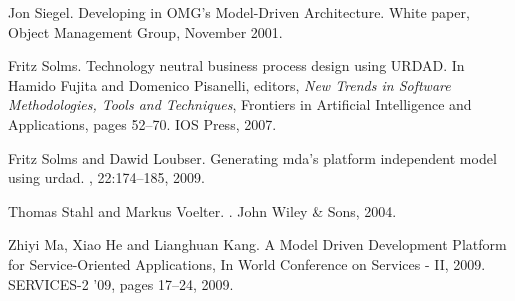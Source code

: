 \begin{thebibliography}{}
Jon Siegel.
\newblock Developing in {OMG}'s {M}odel-{D}riven {A}rchitecture.
\newblock White paper, Object Management Group, November 2001.

Fritz Solms.
\newblock Technology neutral business process design using {URDAD}.
\newblock In Hamido Fujita and Domenico Pisanelli, editors, {\em New Trends in
  Software Methodologies, Tools and Techniques}, Frontiers in Artificial
  Intelligence and Applications, pages 52--70. IOS Press, 2007.

Fritz Solms and Dawid Loubser.
\newblock Generating mda's platform independent model using urdad.
, 22:174--185, 2009.

Thomas Stahl and Markus Voelter.
.
\newblock John Wiley \& Sons, 2004.

Zhiyi Ma, Xiao He and Lianghuan Kang.
\newblock A Model Driven Development Platform for Service-Oriented Applications,
\newblock In World Conference on Services - II, 2009. SERVICES-2 '09, pages 17--24, 2009.


\end{thebibliography}


